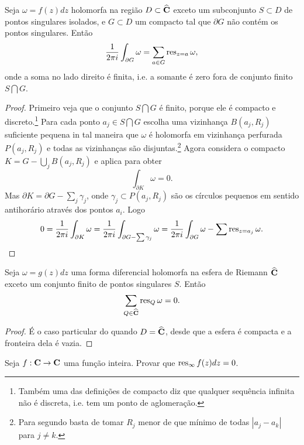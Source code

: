 \begin{teorema}
\label{t:residuos}
Seja $\omega = f(z) dz$ holomorfa na região $D \subset \widehat{\mathbf{C}}$ exceto um subconjunto $S\subset D$
de pontos singulares isolados, e $G\subset D$ um compacto tal que $\partial G$ não contém os pontos singulares.
Então
\begin{equation}
\frac{1}{2\pi i} \int_{\partial G} \omega = \sum_{a\in G} \operatorname{res}_{z=a} \omega,
\end{equation}
onde a soma no lado direito é finita,
i.e. a somante é zero fora de conjunto finito $S\bigcap G$.
\end{teorema}
\begin{proof}
Primeiro veja que o conjunto $S\bigcap G$ é finito,
porque ele é compacto e discreto.\footnote{Também uma das definições de compacto
diz que qualquer sequência infinita não é discreta, i.e. tem um ponto de aglomeração.}
Para cada ponto $a_j\in S\bigcap G$ escolha uma vizinhança $B(a_j,R_j)$ suficiente pequena
in tal maneira que $\omega$ é holomorfa em vizinhança perfurada $P(a_j,R_j)$
e todas as vizinhanças são disjuntas.\footnote{Para segundo basta de tomar $R_j$ menor de que
mínimo de todas $|a_j-a_k|$ para $j\neq k$.}
Agora considera o compacto $K = G - \bigcup_j B(a_j,R_j)$ e aplica  para obter
\[ \int_{\partial K} \omega = 0. \]
Mas $\partial K = \partial G - \sum_j \gamma_j$, onde $\gamma_j \subset P(a_j,R_j)$
são os círculos pequenos em sentido antihorário através dos pontos $a_i$.
Logo
\[ 0 = \frac{1}{2\pi i} \int_{\partial K} \omega = \frac{1}{2\pi i} \int_{\partial G - \sum \gamma_j} \omega
= \frac{1}{2\pi i} \int_{\partial G} \omega - \sum \operatorname{res}_{z=a_j} \omega. \]
\end{proof}

\begin{cor}
\label{reciprocidade-residuos}
Seja $\omega = g(z) dz$ uma forma diferencial holomorfa na esfera de Riemann $\widehat{\mathbf{C}}$
exceto um conjunto finito de pontos singulares $S$. Então
\begin{equation}
\sum_{Q\in\widehat{\mathbf{C}}} \operatorname{res}_Q \omega = 0.
\end{equation}
\end{cor}
\begin{proof}
É o caso particular do  quando $D = \widehat{\mathbf{C}}$,
desde que a esfera é compacta e a fronteira dela é vazia.
\end{proof}

\begin{problema}
Seja $f : \mathbf{C} \to \mathbf{C}$ uma função inteira. Provar que
$\operatorname{res}_\infty f(z) dz = 0$.
\end{problema}

